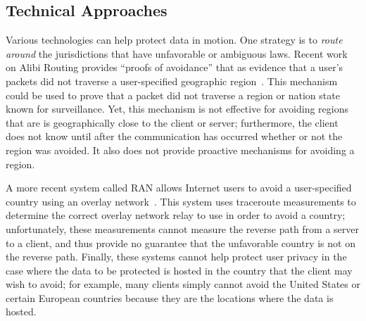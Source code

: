 \subsection{Technical Approaches}
\label{sec:tech_motion}


Various technologies can help protect data in motion.  One strategy is to {\em
route around} the jurisdictions that have unfavorable or ambiguous laws.
Recent work on Alibi Routing provides ``proofs of avoidance'' that as evidence
that a user's packets did not traverse a user-specified geographic
region~\cite{levin2015alibi}.   This mechanism could be used to prove that a
packet did not traverse a region or nation state known for surveillance. Yet,
this mechanism is not effective for avoiding regions that are  is
geographically close to the client or server; furthermore,  the client does
not know until after the communication has occurred whether or not the region
was avoided. It also does not provide proactive mechanisms for avoiding a
region. 

A more recent system called RAN allows  Internet users to avoid a
user-specified country using an overlay network~\cite{edmundson2017ran}.  This
system uses traceroute measurements to determine the correct overlay network
relay to use in order to avoid a country; unfortunately, these measurements
cannot measure the reverse path from a server to a client, and thus provide no
guarantee that the unfavorable country is not on the reverse path. Finally, these
systems cannot help protect user privacy in the case where the data to be protected
is hosted in the country that the client may wish to avoid; for example, many clients
simply cannot avoid the United States or certain European countries because they
are the locations where the data is hosted.

